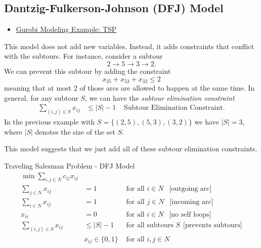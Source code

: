 \subsection{Dantzig-Fulkerson-Johnson (DFJ) Model}
\begin{resource}
\begin{itemize}
\item \href{https://github.com/Gurobi/modeling-examples/tree/master/traveling_salesman}{Gurobi Modeling Example: TSP}
\end{itemize}
\end{resource}
This model does not add new variables.  Instead, it adds constraints that conflict with the subtours.  For instance, consider a subtour
\begin{equation}
2 \to 5 \to 3 \to 2.
\end{equation}
We can prevent this subtour by adding the constraint
\begin{equation}
x_{25} + x_{53} + x_{32}  \leq 2
\end{equation}
meaning that at most 2 of those arcs are allowed to happen at the same time.  In general, for any subtour $S$, we can have the \emph{subtour elimination constraint}
\begin{align}
\sum_{(i,j) \in S} x_{ij} &\leq |S| - 1  & \text{ Subtour Elimination Constraint}.
\end{align}
In the previous example with $S = \{(2,5), (5,3), (3,2)\}$ we have $|S| = 3$, where $|S|$ denotes the size of the set $S$.

This model suggests that we just add all of these subtour elimination constraints.

\begin{general}{Traveling Salesman Problem - DFJ Model}{}
\begin{align}
\label{eq:tsp-DFJ-model}
\min \sum_{i,j \in N} c_{ij} x_{ij}\\
\sum_{j\in N} x_{ij} &= 1 & \text{ for all } i \in N \ \ \text{ [outgoing arc]}\\
\sum_{i \in N} x_{ij} &= 1 & \text{ for all } j \in N \ \ \text{ [incoming arc]}\\
x_{ii} &= 0 & \text{ for all } i \in N \ \ \text{ [no self loops]} \\
\sum_{(i,j) \in S} x_{ij} &\leq |S| -1  & \text{ for all subtours } S \ \ \text{[prevents subtours]}\\
& x_{ij} \in \{0,1\} & \text{ for all } i,j \in N
\end{align}
\end{general}


